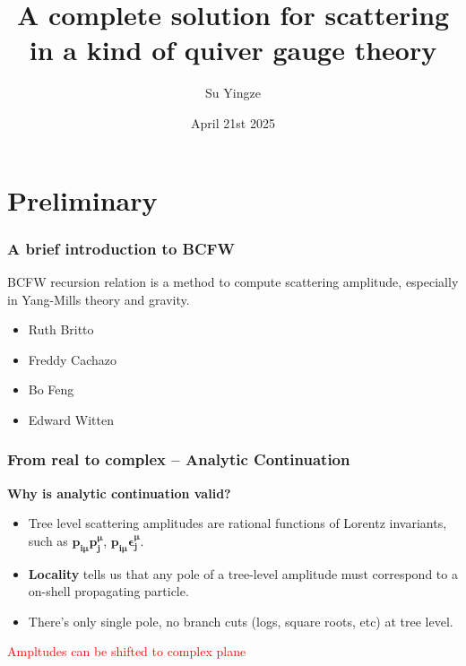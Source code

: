 \documentclass{beamer}
\title[Amplication of BCFW]{A complete solution for scattering in a kind of quiver gauge theory}
\author{Su Yingze}
\institute{Nagoya University}
\date[4 21st 2025]{April 21st 2025}
\begin{document}
\frame{\titlepage}
\section{Preliminary}
\begin{frame}
    \frametitle{A brief introduction to BCFW}
    BCFW recursion relation is a method to compute scattering amplitude, especially in Yang-Mills theory and gravity.
    \par
 \begin{itemize}[label=\textbullet]
    \item Ruth Britto
    \item Freddy Cachazo
    \item Bo Feng
    \item Edward Witten
 \end{itemize}
\end{frame}
\begin{frame}
    \frametitle{From real to complex -- Analytic Continuation}
    \textbf{Why is analytic continuation valid?}
\begin{itemize}
  \item Tree level scattering amplitudes are rational functions of Lorentz invariants, such as $\bm{p_{i\mu}p_j^\mu}$, $\bm{p_{i\mu}\epsilon_j^\mu}$.
  \item \textbf{Locality} tells us that any pole of a tree-level amplitude must correspond to a on-shell propagating particle. 
  \item There's only single pole, no branch cuts (logs, square roots, etc) at tree level.
\end{itemize}
    \begin{center}
    \end{center}
\vspace{0.5em}
\centering
\textcolor{red}{Ampltudes can be shifted to complex plane}
\end{frame}
\end{document}
